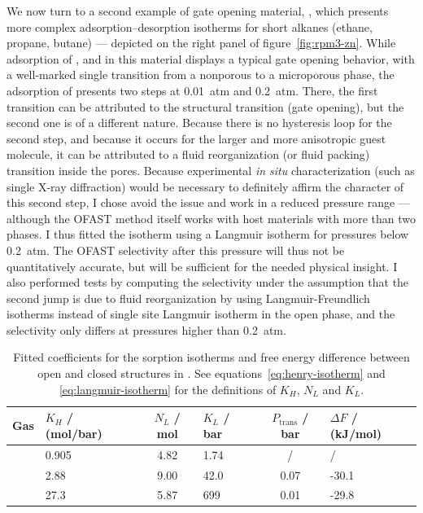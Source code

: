 \documentclass[thesis]{subfiles}
\begin{document}
We now turn to a second example of gate opening material, \RPMZn\cite{Lan2009-2},
which presents more complex adsorption--desorption isotherms for short alkanes
(ethane, propane, butane) --- depicted on the right panel of
figure~\ref{fig:rpm3-zn}. While adsorption of , and  in this
material displays a typical gate opening behavior, with a well-marked single
transition from a nonporous to a microporous phase, the adsorption of 
presents two steps at \SI{0.01}{atm} and \SI{0.2}{atm}. There, the first
transition can be attributed to the structural transition (gate opening), but
the second one is of a different nature. Because there is no hysteresis loop for
the second step, and because it occurs for the larger and more anisotropic guest
molecule, it can be attributed to a fluid reorganization (or fluid packing)
transition inside the pores. Because experimental \emph{in situ}
characterization (such as single X-ray diffraction) would be necessary to
definitely affirm the character of this second step, I chose avoid the issue and
work in a reduced pressure range --- although the OFAST method itself works with
host materials with more than two phases. I thus fitted the  isotherm
using a Langmuir isotherm for pressures below \SI{0.2}{atm}. The OFAST
selectivity after this pressure will thus not be quantitatively accurate, but
will be sufficient for the needed physical insight. I also performed tests by
computing the selectivity under the assumption that the second jump is due to
fluid reorganization by using Langmuir-Freundlich isotherms instead of single
site Langmuir isotherm in the open phase, and the selectivity only differs at
pressures higher than \SI{0.2}{atm}.

\begin{table}[htp]
    \renewcommand{\arraystretch}{1.3}
    \begin{tabularx}{\textwidth}{c C c C c C}
        \textbf{Gas} & $K_H$ / (mol/bar) & $N_L$ / mol & $K_L$ / bar & $P_\text{trans}$ / bar & $\Delta F$ / (kJ/mol)  \\ \hline
            & 0.905             & 4.82        & 1.74        &            /           &          /             \\
            & 2.88              & 9.00        & 42.0        &           0.07         &        -30.1           \\
           & 27.3              & 5.87        & 699         &           0.01         &        -29.8           \\
    \end{tabularx}
    \caption{Fitted coefficients for the sorption isotherms and free energy
    difference between open and closed structures in \RPMZn. See
    equations~\eqref{eq:henry-isotherm} and \eqref{eq:langmuir-isotherm} for the
    definitions of $K_H$, $N_L$ and $K_L$.}
    \label{table:rpm3-zn:fit}
\end{table}
\end{document}
